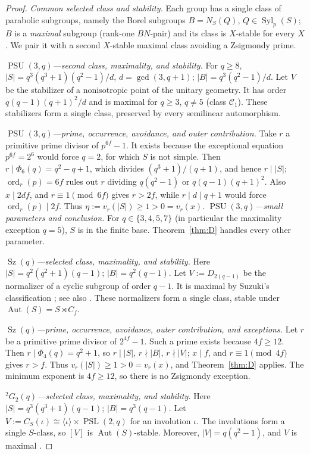 \documentclass[11pt]{amsart}
\theoremstyle{definition}
\theoremstyle{remark}
\DeclareMathOperator{\Aut}{Aut}
\DeclareMathOperator{\Syl}{Syl}
\DeclareMathOperator{\PSL}{PSL}
\DeclareMathOperator{\PSU}{PSU}
\DeclareMathOperator{\Sz}{Sz}
\DeclareMathOperator{\ord}{ord}
\newcommand{\vp}[1]{v_{#1}}
\begin{document}
\begin{proof}
\emph{Common selected class and stability.} Each group has a single class of parabolic subgroups, namely the Borel
subgroups $B=N_S(Q)$, $Q\in\Syl_p(S)$; $B$ is a \emph{maximal}
subgroup (rank-one $BN$-pair) and its class is $X$-stable for every $X$.
We pair it with a second $X$-stable maximal class avoiding a Zsigmondy
prime.

\emph{$\PSU(3,q)$---second class, maximality, and stability.}
For $q\geq8$, $|S|=q^3(q^3+1)(q^2-1)/d$,
$d=\gcd(3,q+1)$; $|B|=q^3(q^2-1)/d$. Let $V$ be the stabilizer of a
nonisotropic point of the unitary geometry. It has order
$q(q-1)(q+1)^2/d$ and is maximal for $q\geq3$, $q\neq5$
\cite[Table~8.5, p.~379]{BHRD} (class $\mathcal{C}_1$). These stabilizers
form a single class, preserved by every semilinear automorphism.

\emph{$\PSU(3,q)$---prime, occurrence, avoidance, and outer contribution.}
Take $r$ a primitive prime divisor of $p^{6f}-1$. It exists because
the exceptional equation $p^{6f}=2^6$ would force $q=2$, for which $S$
is not simple. Then $r\mid\Phi_6(q)=q^2-q+1$,
which divides $(q^3+1)/(q+1)$, and hence $r\mid|S|$;
$\ord_r(p)=6f$ rules out
$r$ dividing $q(q^2-1)$ or $q(q-1)(q+1)^2$. Also $x\mid2df$, and
$r\equiv1\pmod{6f}$ gives $r>2f$, while $r\mid d\mid q+1$ would force
$\ord_r(p)\mid2f$. Thus $\eta:=\vp{r}(|S|)\geq1>0=\vp{r}(x)$.
\emph{$\PSU(3,q)$---small parameters and conclusion.}
For $q\in\{3,4,5,7\}$ (in particular the maximality exception $q=5$),
$S$ is in the finite base. Theorem~\ref{thm:D} handles every other parameter.

\emph{$\Sz(q)$---selected class, maximality, and stability.} Here $|S|=q^2(q^2+1)(q-1)$; $|B|=q^2(q-1)$. Let
$V:=D_{2(q-1)}$ be the normalizer of a cyclic subgroup of order $q-1$.
It is maximal by Suzuki's classification \cite{Suzuki1962}; see also
\cite[Thm.~7.3.5, p.~367, and Table~8.16, p.~384]{BHRD}. These
normalizers form a single class, stable under $\Aut(S)=S\rtimes C_f$.

\emph{$\Sz(q)$---prime, occurrence, avoidance, outer contribution, and
exceptions.} Let $r$ be a primitive prime divisor of $2^{4f}-1$. Such a prime exists
because $4f\geq12$. Then $r\mid\Phi_4(q)=q^2+1$, so $r\mid|S|$,
$r\nmid|B|$, $r\nmid|V|$; $x\mid f$, and
$r\equiv1\pmod{4f}$ gives $r>f$. Thus
$\vp{r}(|S|)\geq1>0=\vp{r}(x)$, and Theorem~\ref{thm:D} applies. The
minimum exponent is $4f\geq12$, so there is no Zsigmondy exception.

\emph{${}^2G_2(q)$---selected class, maximality, and stability.} Here $|S|=q^3(q^3+1)(q-1)$; $|B|=q^3(q-1)$. Let
$V:=C_S(\iota)\cong\langle\iota\rangle\times\PSL(2,q)$ for an involution
$\iota$. The involutions form a single $S$-class, so $[V]$ is
$\Aut(S)$-stable. Moreover, $|V|=q(q^2-1)$, and $V$ is maximal
\cite[Thm.~C, pp.~33--34]{Kleidman1988}.


\end{proof}
\end{document}

